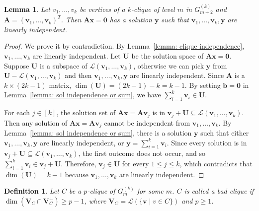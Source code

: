 \documentclass[
final
]{dmtcs-episciences}
\newtheorem{definition}[theorem]{Definition}
\newtheorem{lemma}[theorem]{Lemma}
\begin{document}
\begin{lemma}\label{lemma: 3}
         Let $v_1, \ldots, v_k$ be vertices of
     a $k$-clique of level $m$ in $G^{(k)}_{m+2}$ and  $\mathbf{A} = {(\mathbf{v}_1, \ldots, \mathbf{v}_k)}^T$.
    Then $\mathbf{Ax=0}$ has a solution $\mathbf{y}$ such that $\mathbf{v}_1, \ldots, \mathbf{v}_k, \mathbf{y}$ are linearly independent.
\end{lemma}

\begin{proof}
    We prove it by contradiction. By Lemma~\ref{lemma: clique independence}, $\mathbf{v}_1, \ldots, \mathbf{v}_k$ are linearly independent.
    Let $\mathbf{U}$ be the solution space of $\mathbf{Ax=0}$. Suppose $\mathbf{U}$ is a subspace of $\mathcal{L}(\mathbf{v}_1, \ldots, \mathbf{v}_k)$, otherwise we can pick $\mathbf{y}$ from $\mathbf{U} - \mathcal{L}(\mathbf{v}_1, \ldots, \mathbf{v}_k)$ and then $\mathbf{v}_1, \ldots, \mathbf{v}_k, \mathbf{y}$ are linearly independent.
    Since $\mathbf{A}$ is a $k\times (2k-1)$ matrix,
    $\dim(\mathbf{U}) =  (2k-1)- k = k-1$.
    By setting $\mathbf{b = 0}$ in Lemma~\ref{lemma: sol independence or sum}, we have $\sum_{i=1}^{k} \mathbf{v}_i \in \mathbf{U}$.

    For each $j\in [k]$, the solution set of $\mathbf{Ax=A}\mathbf{{}v}_j$ is in $\mathbf{v}_j + \mathbf{U} \subseteq \mathcal{L}(\mathbf{v}_1, \ldots, \mathbf{v}_k)$.
    Then any solution of $\mathbf{Ax=A}\mathbf{v}_j$ cannot be independent from $\mathbf{v}_1, \ldots, \mathbf{v}_k$.
    By Lemma~\ref{lemma: sol independence or sum}, there is a solution $\mathbf{y}$ such that either $\mathbf{v}_1, \ldots, \mathbf{v}_k, \mathbf{y}$ are linearly independent, or $\mathbf{y} = \sum_{i=1}^k \mathbf{v}_i$. 
    Since every solution is in $\mathbf{v}_j+ \mathbf{U} \subseteq \mathcal{L}(\mathbf{v}_1, \dots, \mathbf{v}_k)$, the first outcome does not occur, and so $\sum_{i=1}^k \mathbf{v}_i \in \mathbf{v}_j+ \mathbf{U}$.
    Therefore, $\mathbf{v}_j \in \mathbf{U}$ for every $1 \le j \le k$, which contradicts that $\dim(\mathbf{U}) = k-1$ because $\mathbf{v}_1, \ldots, \mathbf{v}_k$ are linearly independent.
\end{proof}



\begin{definition}\label{D2}
    Let $C$ be a $p$-clique of $G^{(k)}_{m}$ for some $m$. $C$ is called a \emph{bad} clique if $\dim(\textbf{V}_C \cap \textbf{V}_C^{\perp})\ge p-1$, where
    $\textbf{V}_C=\mathcal{L}(\{\mathbf{v}\mid v\in C\})$ and $p\ge 1$.
    \end{definition}
\end{document}
